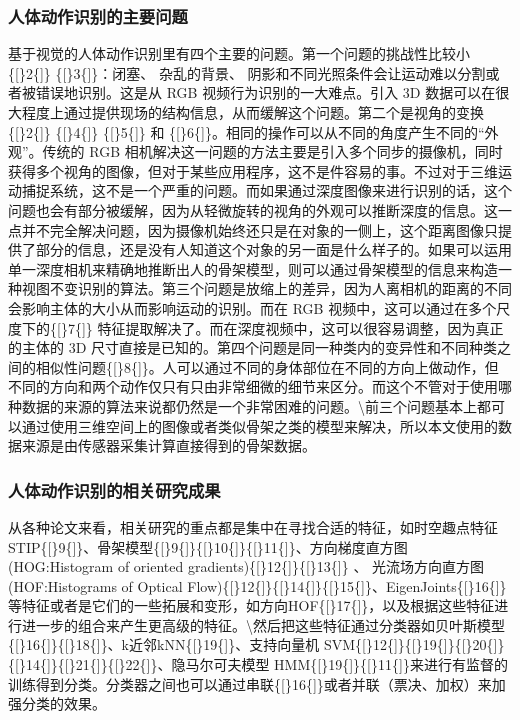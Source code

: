 \subsubsection{人体动作识别的主要问题}\label{ux4ebaux4f53ux52a8ux4f5cux8bc6ux522bux7684ux4e3bux8981ux95eeux9898}

基于视觉的人体动作识别里有四个主要的问题。第一个问题的挑战性比较小
\{{[}\}2\{{]}\} \{{[}\}3\{{]}\}：闭塞、 杂乱的背景、
阴影和不同光照条件会让运动难以分割或者被错误地识别。这是从 RGB
视频行为识别的一大难点。引入 3D
数据可以在很大程度上通过提供现场的结构信息，从而缓解这个问题。第二个是视角的变换\{{[}\}2\{{]}\}
\{{[}\}4\{{]}\} \{{[}\}5\{{]}\} 和
\{{[}\}6\{{]}\}。相同的操作可以从不同的角度产生不同的``外观''。传统的
RGB
相机解决这一问题的方法主要是引入多个同步的摄像机，同时获得多个视角的图像，但对于某些应用程序，这不是件容易的事。不过对于三维运动捕捉系统，这不是一个严重的问题。而如果通过深度图像来进行识别的话，这个问题也会有部分被缓解，因为从轻微旋转的视角的外观可以推断深度的信息。这一点并不完全解决问题，因为摄像机始终还只是在对象的一侧上，这个距离图像只提供了部分的信息，还是没有人知道这个对象的另一面是什么样子的。如果可以运用单一深度相机来精确地推断出人的骨架模型，则可以通过骨架模型的信息来构造一种视图不变识别的算法。第三个问题是放缩上的差异，因为人离相机的距离的不同会影响主体的大小从而影响运动的识别。而在
RGB 视频中，这可以通过在多个尺度下的\{{[}\}7\{{]}\}
特征提取解决了。而在深度视频中，这可以很容易调整，因为真正的主体的 3D
尺寸直接是已知的。第四个问题是同一种类内的变异性和不同种类之间的相似性问题\{{[}\}8\{{]}\}。人可以通过不同的身体部位在不同的方向上做动作，但不同的方向和两个动作仅只有只由非常细微的细节来区分。而这个不管对于使用哪种数据的来源的算法来说都仍然是一个非常困难的问题。\textbackslash{}前三个问题基本上都可以通过使用三维空间上的图像或者类似骨架之类的模型来解决，所以本文使用的数据来源是由传感器采集计算直接得到的骨架数据。

\subsubsection{人体动作识别的相关研究成果}\label{ux4ebaux4f53ux52a8ux4f5cux8bc6ux522bux7684ux76f8ux5173ux7814ux7a76ux6210ux679c}

从各种论文来看，相关研究的重点都是集中在寻找合适的特征，如时空趣点特征STIP\{{[}\}9\{{]}\}、骨架模型\{{[}\}9\{{]}\}\{{[}\}10\{{]}\}\{{[}\}11\{{]}\}、方向梯度直方图(HOG:Histogram
of oriented gradients)\{{[}\}12\{{]}\}\{{[}\}13\{{]}\} 、
光流场方向直方图(HOF:Histograms of Optical
Flow)\{{[}\}12\{{]}\}\{{[}\}14\{{]}\}\{{[}\}15\{{]}\}、EigenJoints\{{[}\}16\{{]}\}等特征或者是它们的一些拓展和变形，如方向HOF\{{[}\}17\{{]}\}，以及根据这些特征进行进一步的组合来产生更高级的特征。\textbackslash{}然后把这些特征通过分类器如贝叶斯模型\{{[}\}16\{{]}\}\{{[}\}18\{{]}\}、k近邻kNN\{{[}\}19\{{]}\}、支持向量机
SVM\{{[}\}12\{{]}\}\{{[}\}19\{{]}\}\{{[}\}20\{{]}\}\{{[}\}14\{{]}\}\{{[}\}21\{{]}\}\{{[}\}22\{{]}\}、隐马尔可夫模型
HMM\{{[}\}19\{{]}\}\{{[}\}11\{{]}\}来进行有监督的训练得到分类。分类器之间也可以通过串联\{{[}\}16\{{]}\}或者并联（票决、加权）来加强分类的效果。


